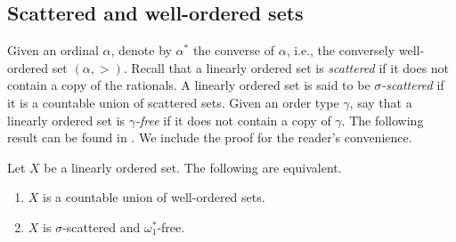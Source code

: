 \subsection{Scattered and well-ordered sets}\label{sec:prelim}

Given an ordinal $\alpha$, denote by $\alpha^*$ the converse of $\alpha$, i.e., the conversely well-ordered set $(\alpha,>)$.
Recall that a linearly ordered set is \emph{scattered} if it does not contain a copy of the rationals.
A linearly ordered set is said to be \emph{$\sigma$-scattered} if it is a countable union of scattered sets.
Given an order type $\gamma$, say that a linearly ordered set is \emph{$\gamma$-free} if it does not contain a copy of $\gamma$.
The following result can be found in \cite{partition}.
We include the proof for the reader's convenience.

\begin{theorem}\label{thm:todorcevic}
    Let $X$ be a linearly ordered set.
    The following are equivalent.
    \begin{enumerate}[label=(\roman*)]
        \item $X$ is a countable union of well-ordered sets.
        \item $X$ is $\sigma$-scattered and $\omega_1^*$-free.
    \end{enumerate}
\end{theorem}

